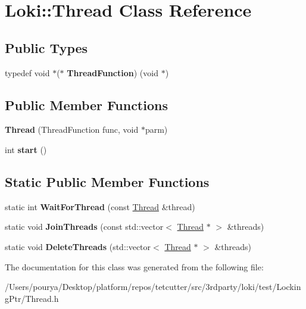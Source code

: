 \hypertarget{classLoki_1_1Thread}{}\section{Loki\+:\+:Thread Class Reference}
\label{classLoki_1_1Thread}
\subsection*{Public Types}
\begin{DoxyCompactItemize}
\item 
\hypertarget{classLoki_1_1Thread_a097e3ad12e046201a0c76b688d1c7faa}{}typedef void $\ast$($\ast$ {\bfseries Thread\+Function}) (void $\ast$)\label{classLoki_1_1Thread_a097e3ad12e046201a0c76b688d1c7faa}

\end{DoxyCompactItemize}
\subsection*{Public Member Functions}
\begin{DoxyCompactItemize}
\item 
\hypertarget{classLoki_1_1Thread_a46fb82697df584ce905eb3457b3078cb}{}{\bfseries Thread} (Thread\+Function func, void $\ast$parm)\label{classLoki_1_1Thread_a46fb82697df584ce905eb3457b3078cb}

\item 
\hypertarget{classLoki_1_1Thread_a7ab5bb92ea5811ffc0f4448050880e96}{}int {\bfseries start} ()\label{classLoki_1_1Thread_a7ab5bb92ea5811ffc0f4448050880e96}

\end{DoxyCompactItemize}
\subsection*{Static Public Member Functions}
\begin{DoxyCompactItemize}
\item 
\hypertarget{classLoki_1_1Thread_a7080754d000d44e9f4ddcc898500b8a0}{}static int {\bfseries Wait\+For\+Thread} (const \hyperlink{classLoki_1_1Thread}{Thread} \&thread)\label{classLoki_1_1Thread_a7080754d000d44e9f4ddcc898500b8a0}

\item 
\hypertarget{classLoki_1_1Thread_a7f919e4d198a1d23f7973a40b10085f7}{}static void {\bfseries Join\+Threads} (const std\+::vector$<$ \hyperlink{classLoki_1_1Thread}{Thread} $\ast$ $>$ \&threads)\label{classLoki_1_1Thread_a7f919e4d198a1d23f7973a40b10085f7}

\item 
\hypertarget{classLoki_1_1Thread_a891f3fe32c6d67e033aa97ac3bbc2129}{}static void {\bfseries Delete\+Threads} (std\+::vector$<$ \hyperlink{classLoki_1_1Thread}{Thread} $\ast$ $>$ \&threads)\label{classLoki_1_1Thread_a891f3fe32c6d67e033aa97ac3bbc2129}

\end{DoxyCompactItemize}


The documentation for this class was generated from the following file\+:\begin{DoxyCompactItemize}
\item 
/\+Users/pourya/\+Desktop/platform/repos/tetcutter/src/3rdparty/loki/test/\+Locking\+Ptr/Thread.\+h\end{DoxyCompactItemize}
